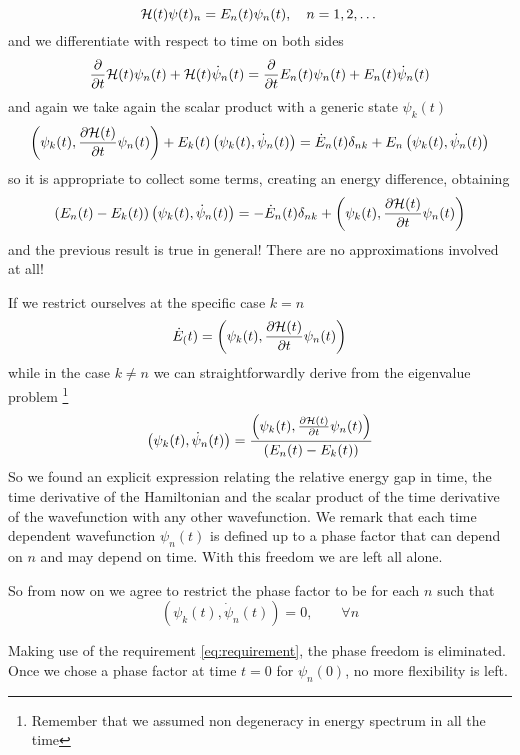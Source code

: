 \begin{equation}
\mathcal{H}(t) \psi(t)_n=E_n(t)\psi_n(t), \quad n=1,2,\dots  
\end{equation}
and we differentiate with respect to time on both sides
\begin{equation}
\frac{\partial }{\partial t}\mathcal{H}(t)\psi_n(t) +\mathcal{H}(t)\dot{\psi}_n(t)=\frac{\partial }{\partial t}E_n(t)\psi_n(t)+E_n(t)\dot{\psi}_n(t)
\end{equation}
and again we take again the scalar product with a generic state $ \psi_k(t) $
\begin{equation}
\left(\psi_k(t),\frac{\partial \mathcal{H}(t)}{\partial t}\psi_n(t) \right)+E_k(t)\left(\psi_k(t),\dot{\psi}_n(t) \right)=\dot{E}_n(t)\delta_{nk}+E_n\left(\psi_k(t),\dot{\psi}_n(t) \right)
\end{equation}
so it is appropriate to collect some terms, creating an energy difference, obtaining 
\begin{equation}
\left(E_n(t)-E_k(t)\right)\left(\psi_k(t),\dot{\psi}_n(t) \right)=-\dot{E}_n(t)\delta_{nk}+\left(\psi_k(t),\frac{\partial \mathcal{H}(t)}{\partial t}\psi_n(t) \right)
\end{equation}
and the previous result is true in general! There are no approximations involved at all!

If we restrict ourselves at the specific case $ k=n $
\begin{equation}
\dot{E}_(t)=\left(\psi_k(t),\frac{\partial \mathcal{H}(t)}{\partial t}\psi_n(t) \right)
\end{equation}
while in the case $ k\neq n $ we can straightforwardly derive from the eigenvalue problem \footnote{Remember that we assumed non degeneracy in energy spectrum in all the time}
\begin{equation}
\left(\psi_k(t),\dot{\psi}_n(t)\right)=\frac{\left(\psi_k(t),\frac{\partial \mathcal{H}(t)}{\partial t}\psi_n(t) \right)}{\left(E_n(t)-E_k(t)\right)}
\end{equation}
So we found an explicit expression relating the relative energy gap in time, the time derivative of the Hamiltonian and the scalar product of the time derivative of the wavefunction with any other wavefunction. We remark that each time dependent wavefunction $ \psi_n(t) $ is defined up to a phase factor that can depend on $ n $ and may depend on time. With this freedom we are left all alone. 

So from now on we agree to restrict the phase factor to be for each $ n $ such that 
\begin{equation}
\left(\psi_k(t),\dot{\psi}_n(t)\right)=0, \qquad \forall n
\label{eq:requirement}
\end{equation}
\begin{rem}
	Making use of the requirement \eqref{eq:requirement}, the phase freedom is eliminated. Once we chose a phase factor at time $ t=0 $ for $ \psi_n(0) $, no more flexibility is left.
\end{rem}

